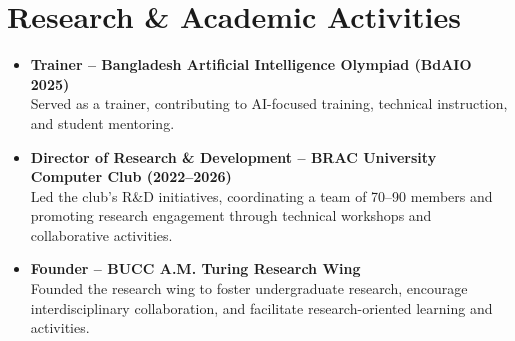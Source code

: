 \section{Research \& Academic Activities}

\begin{itemize}

    \item \textbf{Trainer -- Bangladesh Artificial Intelligence Olympiad (BdAIO 2025)}\\
    Served as a trainer, contributing to AI-focused training, technical instruction, and student mentoring.

    \item \textbf{Director of Research \& Development -- BRAC University Computer Club (2022--2026)}\\
    Led the club's R\&D initiatives, coordinating a team of 70--90 members and promoting research engagement through technical workshops and collaborative activities.

    \item \textbf{Founder -- BUCC A.M. Turing Research Wing}\\
    Founded the research wing to foster undergraduate research, encourage interdisciplinary collaboration, and facilitate research-oriented learning and activities.

\end{itemize}

\endinput